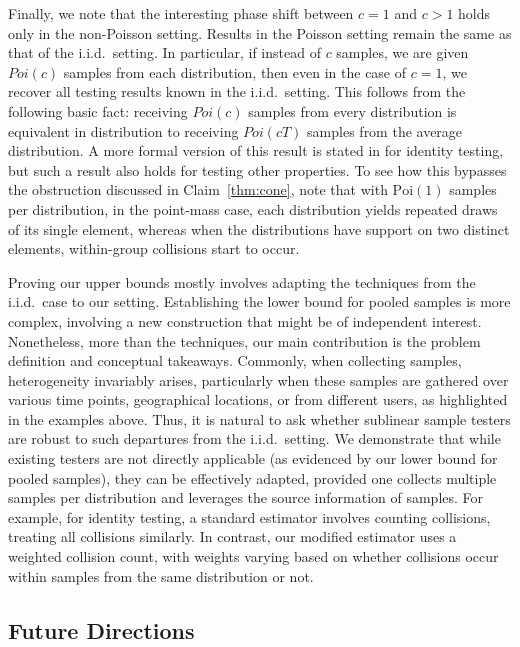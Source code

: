 \documentclass[10pt]{article} %
\theoremstyle{plain}
\begin{document}
Finally, we note that the interesting phase shift between $c=1$ and $c>1$ holds only in the non-Poisson setting. Results in the Poisson setting remain the same as that of the i.i.d.\ setting. In particular, if instead of $c$ samples,  we are given $Poi(c)$ samples from each distribution, then even in the case of $c=1$, we recover all testing results known in the i.i.d.\ setting. This  follows from the following basic fact: receiving $Poi(c)$ samples from every distribution is equivalent in distribution to receiving $Poi(cT)$ samples from the average distribution. A more formal version of this result is stated in  for identity testing, but such a result also holds for testing other properties. To see how this bypasses the obstruction discussed in Claim~\ref{thm:cone}, note that with $\mathrm{Poi}(1)$ samples per distribution, in the point-mass case, each distribution yields repeated draws of its single element, whereas when the distributions have support on two distinct elements, within-group collisions start to occur.

Proving our upper bounds mostly involves adapting the techniques from the i.i.d.\ case to our setting.  Establishing the lower bound for pooled samples is more complex, involving a new construction that might be of independent interest. Nonetheless, more than the techniques, our main contribution is the problem definition and conceptual takeaways. Commonly, when collecting samples, heterogeneity invariably arises, particularly when these samples are gathered over various time points, geographical locations, or from different users, as highlighted in the examples above. Thus, it is natural to ask whether sublinear sample testers are robust to such departures from the i.i.d.\ setting.  We demonstrate that while existing testers are not directly applicable (as evidenced by our lower bound for pooled samples), they can be effectively adapted, provided one collects multiple samples per distribution and leverages the source information of samples. For example, for identity testing, a standard estimator involves counting collisions, treating all collisions similarly. In contrast, our modified estimator uses a weighted collision count, with weights varying based on whether collisions occur within samples from the same distribution or not.


\subsection{Future Directions}
\end{document}
